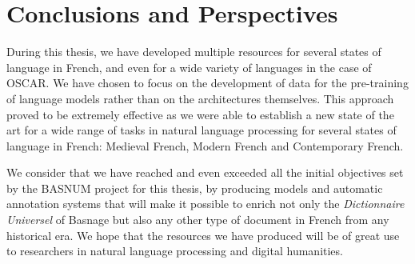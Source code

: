 \chapter{Conclusions and Perspectives}

During this thesis, we have developed multiple resources for several states of language in French, and even for a wide variety of languages in the case of OSCAR. We have chosen to focus on the development of data for the pre-training of language models rather than on the architectures themselves. This approach proved to be extremely effective as we were able to establish a new state of the art for a wide range of tasks in natural language processing for several states of language in French: Medieval French, Modern French and Contemporary French.

We consider that we have reached and even exceeded all the initial objectives set by the BASNUM project for this thesis, by producing models and automatic annotation systems that will make it possible to enrich not only the \emph{Dictionnaire Universel} of Basnage but also any other type of document in French from any historical era. We hope that the resources we have produced will be of great use to researchers in natural language processing and digital humanities.
